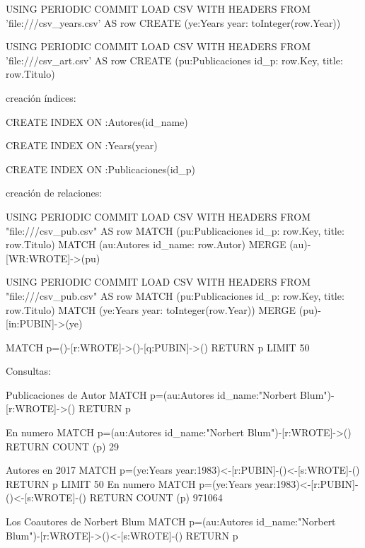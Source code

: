 USING PERIODIC COMMIT
LOAD CSV WITH HEADERS FROM 'file:///csv_years.csv' AS row
CREATE (ye:Years { year: toInteger(row.Year)})

USING PERIODIC COMMIT
LOAD CSV WITH HEADERS FROM 'file:///csv_art.csv' AS row
CREATE (pu:Publicaciones { id_p: row.Key, title: row.Titulo})

creación índices:

CREATE INDEX ON :Autores(id_name)

CREATE INDEX ON :Years(year)

CREATE INDEX ON :Publicaciones(id_p)

creación de relaciones:

USING PERIODIC COMMIT
LOAD CSV WITH HEADERS FROM "file:///csv_pub.csv" AS row
MATCH (pu:Publicaciones { id_p: row.Key, title: row.Titulo})
MATCH (au:Autores { id_name: row.Autor})
MERGE (au)-[WR:WROTE]->(pu)

USING PERIODIC COMMIT
LOAD CSV WITH HEADERS FROM "file:///csv_pub.csv" AS row
MATCH (pu:Publicaciones { id_p: row.Key, title: row.Titulo})
MATCH (ye:Years { year: toInteger(row.Year)})
MERGE (pu)-[in:PUBIN]->(ye)


MATCH p=()-[r:WROTE]->()-[q:PUBIN]->() RETURN p LIMIT 50

Consultas:

Publicaciones de Autor
MATCH p=(au:Autores {id_name:"Norbert Blum"})-[r:WROTE]->() RETURN p

En numero
MATCH p=(au:Autores {id_name:"Norbert Blum"})-[r:WROTE]->() RETURN COUNT (p)
29

Autores en 2017
MATCH p=(ye:Years {year:1983})<-[r:PUBIN]-()<-[s:WROTE]-() RETURN p LIMIT 50
En numero
MATCH p=(ye:Years {year:1983})<-[r:PUBIN]-()<-[s:WROTE]-() RETURN COUNT (p)
971064

Los Coautores de Norbert Blum
MATCH p=(au:Autores {id_name:"Norbert Blum"})-[r:WROTE]->()<-[s:WROTE]-() RETURN p





